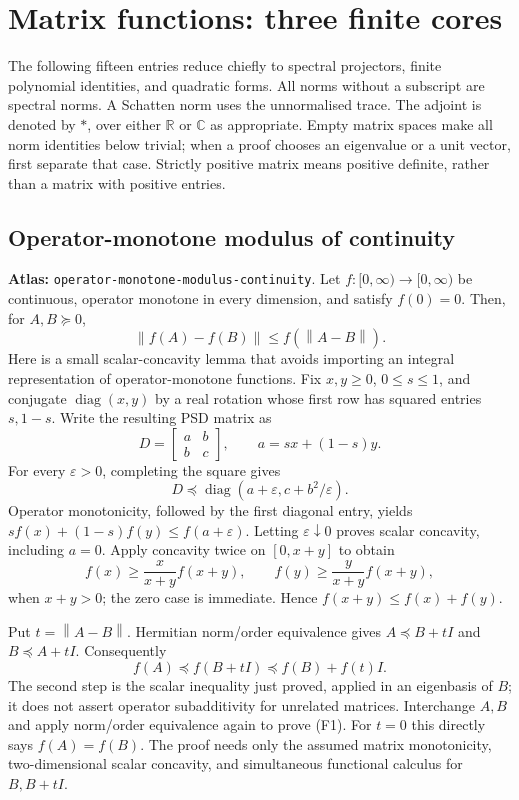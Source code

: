 \documentclass[11pt,a4paper]{article}
\newcommand{\R}{\mathbb R}
\newcommand{\C}{\mathbb C}
\newcommand{\norm}[1]{\left\lVert#1\right\rVert}
\DeclareMathOperator{\diag}{diag}
\DeclareRobustCommand{\code}[1]{{\footnotesize\urlstyle{tt}\nolinkurl{#1}}}
\begin{document}
\section{Matrix functions: three finite cores}
\label{sec:functions-finite-cores}

The following fifteen entries reduce chiefly to spectral projectors, finite
polynomial identities, and quadratic forms. All norms without a subscript are
spectral norms. A Schatten norm uses the unnormalised trace. The adjoint is
denoted by $*$, over either $\R$ or $\C$ as appropriate. Empty matrix spaces
make all norm identities below trivial; when a proof chooses an eigenvalue or
a unit vector, first separate that case. Strictly positive matrix means positive
definite, rather than a matrix with positive entries.

\subsection{Operator-monotone modulus of continuity}
\label{sec:operator-monotone-modulus-continuity}
\textbf{Atlas:} \code{operator-monotone-modulus-continuity}.
Let $f:[0,\infty)\to[0,\infty)$ be continuous, operator monotone in every
dimension, and satisfy $f(0)=0$. Then, for $A,B\succeq0$,
\[
                 \norm{f(A)-f(B)}\le f(\norm{A-B}).                 \tag{F1}
\]
Here is a small scalar-concavity lemma that avoids importing an integral
representation of operator-monotone functions. Fix $x,y\ge0$, $0\le s\le1$,
and conjugate $\diag(x,y)$ by a real rotation whose first row has squared
entries $s,1-s$. Write the resulting PSD matrix as
\[
 D=\begin{bmatrix}a&b\\b&c\end{bmatrix},\qquad a=sx+(1-s)y.
\]
For every $\varepsilon>0$, completing the square gives
\[
 D\preceq\diag(a+\varepsilon,c+b^2/\varepsilon).
\]
Operator monotonicity, followed by the first diagonal entry, yields
$sf(x)+(1-s)f(y)\le f(a+\varepsilon)$. Letting $\varepsilon\downarrow0$
proves scalar concavity, including $a=0$. Apply concavity twice on
$[0,x+y]$ to obtain
\[
 f(x)\ge\frac{x}{x+y}f(x+y),\qquad
 f(y)\ge\frac{y}{x+y}f(x+y),
\]
when $x+y>0$; the zero case is immediate. Hence
$f(x+y)\le f(x)+f(y)$.

Put $t=\norm{A-B}$. Hermitian norm/order equivalence gives
$A\preceq B+tI$ and $B\preceq A+tI$. Consequently
\[
 f(A)\preceq f(B+tI)\preceq f(B)+f(t)I.
\]
The second step is the scalar inequality just proved, applied in an eigenbasis
of $B$; it does not assert operator subadditivity for unrelated matrices.
Interchange $A,B$ and apply norm/order equivalence again to prove (F1).
For $t=0$ this directly says $f(A)=f(B)$. The proof needs only the assumed
matrix monotonicity, two-dimensional scalar concavity, and simultaneous
functional calculus for $B,B+tI$.
\end{document}
